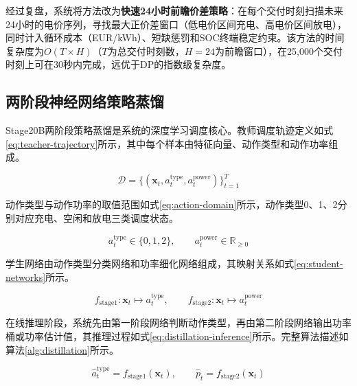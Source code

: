 \documentclass[12pt,a4paper]{ctexbook}
\begin{document}
经过复盘，系统将方法改为\textbf{快速24小时前瞻价差策略}：在每个交付时刻扫描未来24小时的电价序列，寻找最大正价差窗口（低电价区间充电、高电价区间放电），同时计入循环成本（EUR/kWh）、短缺惩罚和SOC终端稳定约束。该方法的时间复杂度为$O(T \times H)$（$T$为总交付时刻数，$H=24$为前瞻窗口），在25,000个交付时刻上可在30秒内完成，远优于DP的指数级复杂度。\cite{bo-two-stage-rolling-2025,li-mpc-microgrid-2025,drl-energy-storage-2023}

\subsection{两阶段神经网络策略蒸馏}

Stage20B两阶段策略蒸馏是系统的深度学习调度核心。教师调度轨迹定义如式\ref{eq:teacher-trajectory}所示，其中每个样本由特征向量、动作类型和动作功率组成。\cite{policy-distillation-2016}

\begin{equation}
\mathcal{D} = \{(\mathbf{x}_t, a_t^{\text{type}}, a_t^{\text{power}})\}_{t=1}^{T}
\label{eq:teacher-trajectory}
\end{equation}

动作类型与动作功率的取值范围如式\ref{eq:action-domain}所示，动作类型0、1、2分别对应充电、空闲和放电三类调度状态。

\begin{equation}
a_t^{\text{type}} \in \{0,1,2\}, \qquad a_t^{\text{power}} \in \mathbb{R}_{\ge 0}
\label{eq:action-domain}
\end{equation}

学生网络由动作类型分类网络和功率细化网络组成，其映射关系如式\ref{eq:student-networks}所示。

\begin{equation}
f_{\text{stage1}}: \mathbf{x}_t \mapsto a_t^{\text{type}}, \qquad
f_{\text{stage2}}: \mathbf{x}_t \mapsto a_t^{\text{power}}
\label{eq:student-networks}
\end{equation}

在线推理阶段，系统先由第一阶段网络判断动作类型，再由第二阶段网络输出功率桶或功率估计值，其推理过程如式\ref{eq:distillation-inference}所示。完整算法描述如算法\ref{alg:distillation}所示。

\begin{equation}
\hat{a}_t^{\text{type}} = f_{\text{stage1}}(\mathbf{x}_t), \qquad
\hat{p}_t = f_{\text{stage2}}(\mathbf{x}_t)
\label{eq:distillation-inference}
\end{equation}
\end{document}
